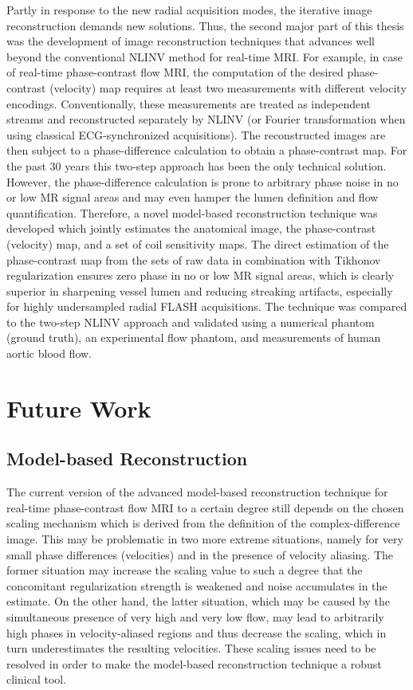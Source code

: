 Partly in response to the new radial acquisition modes, the iterative image reconstruction demands new solutions. Thus, the second major part of this thesis was the development of image reconstruction techniques that advances well beyond the conventional \acs{NLINV} method for real-time MRI. For example, in case of real-time phase-contrast flow MRI, the computation of the desired phase-contrast (velocity) map requires at least two measurements with different velocity encodings. Conventionally, these measurements are treated as independent streams and reconstructed separately by NLINV (or Fourier transformation when using classical \acs{ECG}-synchronized acquisitions). The reconstructed images are then subject to a phase-difference calculation to obtain a phase-contrast map. For the past \num{30} years this two-step approach has been the only technical solution. However, the phase-difference calculation is prone to arbitrary phase noise in no or low MR signal areas and may even hamper the lumen definition and flow quantification. Therefore, a novel model-based reconstruction technique was developed which jointly estimates the anatomical image, the phase-contrast (velocity) map, and a set of coil sensitivity maps. The direct estimation of the phase-contrast map from the sets of raw data in combination with Tikhonov regularization ensures zero phase in no or low MR signal areas, which is clearly superior in sharpening vessel lumen and reducing streaking artifacts, especially for highly undersampled radial FLASH acquisitions. The technique was compared to the two-step NLINV approach and validated using a numerical phantom (ground truth), an experimental flow phantom, and measurements of human aortic blood flow.


\section{Future Work}

\subsection*{Model-based Reconstruction}
The current version of the advanced model-based reconstruction technique for real-time phase-contrast flow MRI to a certain degree still depends on the chosen scaling mechanism which is derived from the definition of the complex-difference image. This may be problematic in two more extreme situations, namely for very small phase differences (velocities) and in the presence of velocity aliasing. The former situation may increase the scaling value to such a degree that the concomitant regularization strength is weakened and noise accumulates in the estimate. On the other hand, the latter situation, which may be caused by the simultaneous presence of very high and very low flow, may lead to arbitrarily high phases in velocity-aliased regions and thus decrease the scaling, which in turn underestimates the resulting velocities. These scaling issues need to be resolved in order to make the model-based reconstruction technique a robust clinical tool.

